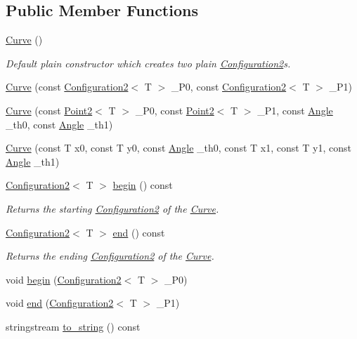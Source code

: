 \subsection*{Public Member Functions}
\begin{DoxyCompactItemize}
\item 
\mbox{\hyperlink{class_curve_a43ec90b53ea751c2df30ee3688af8a30}{Curve}} ()
\begin{DoxyCompactList}\small\item\em Default plain constructor which creates two plain {\ttfamily \mbox{\hyperlink{class_configuration2}{Configuration2}}}s. \end{DoxyCompactList}\item 
\mbox{\hyperlink{class_curve_a5e4d06fa2e01878625e9f9c73f8d760b}{Curve}} (const \mbox{\hyperlink{class_configuration2}{Configuration2}}$<$ T $>$ \+\_\+\+P0, const \mbox{\hyperlink{class_configuration2}{Configuration2}}$<$ T $>$ \+\_\+\+P1)
\item 
\mbox{\hyperlink{class_curve_a8273498ecf9db747d2449fd0afc4702f}{Curve}} (const \mbox{\hyperlink{class_point2}{Point2}}$<$ T $>$ \+\_\+\+P0, const \mbox{\hyperlink{class_point2}{Point2}}$<$ T $>$ \+\_\+\+P1, const \mbox{\hyperlink{class_angle}{Angle}} \+\_\+th0, const \mbox{\hyperlink{class_angle}{Angle}} \+\_\+th1)
\item 
\mbox{\hyperlink{class_curve_a96b350c1818163ee7491f7474938a36d}{Curve}} (const T x0, const T y0, const \mbox{\hyperlink{class_angle}{Angle}} \+\_\+th0, const T x1, const T y1, const \mbox{\hyperlink{class_angle}{Angle}} \+\_\+th1)
\item 
\mbox{\hyperlink{class_configuration2}{Configuration2}}$<$ T $>$ \mbox{\hyperlink{class_curve_a5d0d409315773f72642e4323cb202711}{begin}} () const
\begin{DoxyCompactList}\small\item\em Returns the starting {\ttfamily \mbox{\hyperlink{class_configuration2}{Configuration2}}} of the {\ttfamily \mbox{\hyperlink{class_curve}{Curve}}}. \end{DoxyCompactList}\item 
\mbox{\hyperlink{class_configuration2}{Configuration2}}$<$ T $>$ \mbox{\hyperlink{class_curve_a08b72b1c8922c1132254d8f2b98fd78d}{end}} () const
\begin{DoxyCompactList}\small\item\em Returns the ending {\ttfamily \mbox{\hyperlink{class_configuration2}{Configuration2}}} of the {\ttfamily \mbox{\hyperlink{class_curve}{Curve}}}. \end{DoxyCompactList}\item 
void \mbox{\hyperlink{class_curve_a450ecb2eb0200c4f175ad5fc6afe4cb2}{begin}} (\mbox{\hyperlink{class_configuration2}{Configuration2}}$<$ T $>$ \+\_\+\+P0)
\item 
void \mbox{\hyperlink{class_curve_a5b11ffc442dcdca2def5d09ad4fbb424}{end}} (\mbox{\hyperlink{class_configuration2}{Configuration2}}$<$ T $>$ \+\_\+\+P1)
\item 
stringstream \mbox{\hyperlink{class_curve_a92e5b3a7445040e0e1e8a96707c5e6c2}{to\+\_\+string}} () const
\end{DoxyCompactItemize}
